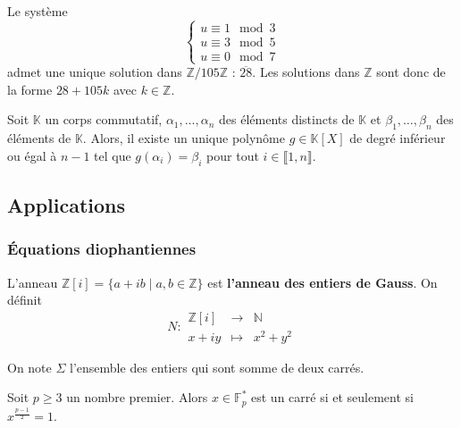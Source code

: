   \begin{example}
    Le système
    \[
      \begin{cases}
        u \equiv 1 \mod 3 \\
        u \equiv 3 \mod 5 \\
        u \equiv 0 \mod 7
      \end{cases}
    \]
    admet une unique solution dans $\mathbb{Z}/105\mathbb{Z}$ : $\overline{28}$. Les solutions dans $\mathbb{Z}$ sont donc de la forme $28 + 105k$ avec $k \in \mathbb{Z}$.
  \end{example}

  \begin{application}
    Soit $\mathbb{K}$ un corps commutatif, $\alpha_1, \dots, \alpha_n$ des éléments distincts de $\mathbb{K}$ et $\beta_1, \dots, \beta_n$ des éléments de $\mathbb{K}$. Alors, il existe un unique polynôme $g \in \mathbb{K}[X]$ de degré inférieur ou égal à $n-1$ tel que $g(\alpha_i) = \beta_i$ pour tout $i \in \llbracket 1, n \rrbracket$.
  \end{application}

  \subsection{Applications}

  \subsubsection{Équations diophantiennes}


  \begin{definition}
    L'anneau $\mathbb{Z}[i] = \{ a + ib \mid a, b \in \mathbb{Z} \}$ est \textbf{l'anneau des entiers de Gauss}. On définit
    \[
      N :
      \begin{array}{ccc}
        \mathbb{Z}[i] &\rightarrow& \mathbb{N} \\
        x+iy &\mapsto& x^2 + y^2
      \end{array}
    \]
  \end{definition}


  \begin{notation}
    On note $\Sigma$ l'ensemble des entiers qui sont somme de deux carrés.
  \end{notation}

  \begin{lemma}
    Soit $p \geq 3$ un nombre premier. Alors $x \in \mathbb{F}^*_p$ est un carré si et seulement si $x^{\frac{p-1}{2}} = 1$.
  \end{lemma}

